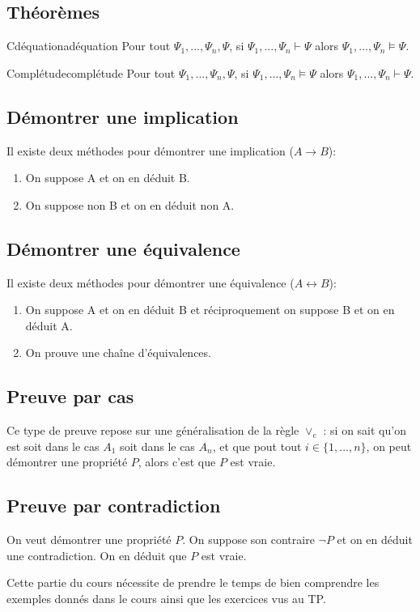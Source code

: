 \subsection{Théorèmes}
\begin{theorem}{Cdéquation}{adéquation}
Pour tout $\Psi_1,...,\Psi_n,\Psi$, si $\Psi_1,...,\Psi_n\vdash\Psi$ alors $\Psi_1,...,\Psi_n\vDash\Psi$.
\end{theorem}
\begin{theorem}{Complétude}{complétude}
Pour tout $\Psi_1,...,\Psi_n,\Psi$, si $\Psi_1,...,\Psi_n\vDash\Psi$ alors $\Psi_1,...,\Psi_n\vdash\Psi$.
\end{theorem}

\subsection{Démontrer une implication}
Il existe deux méthodes pour démontrer une implication ($A\rightarrow B$):
\begin{enumerate}
    \item On suppose A et on en déduit B.
    \item On suppose non B et on en déduit non A.
\end{enumerate}

\subsection{Démontrer une équivalence}
Il existe deux méthodes pour démontrer une équivalence ($A\leftrightarrow B$):
\begin{enumerate}
    \item On suppose A et on en déduit B et réciproquement on suppose B et on en déduit A.
    \item On prouve une chaîne d'équivalences.
\end{enumerate}

\subsection{Preuve par cas}
Ce type de preuve repose sur une généralisation de la règle $\lor_e$ : si on sait qu'on est soit dans le cas $A_1$ soit dans le cas $A_n$, et que pout tout $i\in\{1,...,n\}$, on peut démontrer une propriété $P$, alors c'est que $P$ est vraie.

\subsection{Preuve par contradiction}
On veut démontrer une propriété $P$. On suppose son contraire $\neg P$ et on en déduit une contradiction. On en déduit que $P$ est vraie.

\begin{remark}
Cette partie du cours nécessite de prendre le temps de bien comprendre les exemples donnés dans le cours ainsi que les exercices vus au TP.
\end{remark}